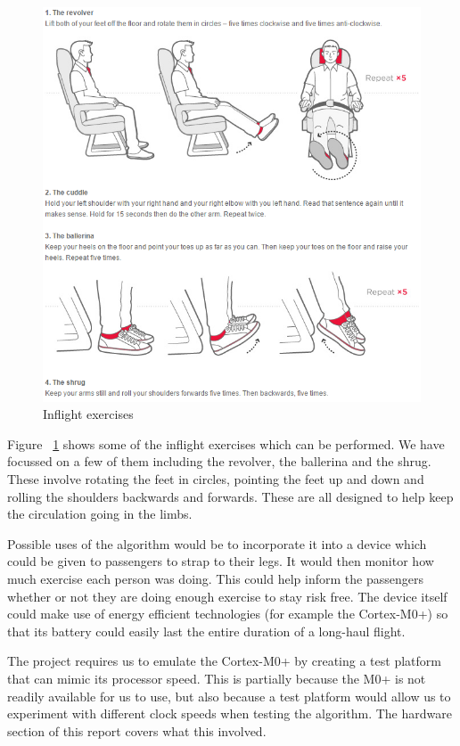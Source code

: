 \begin{figure}[h]
  \centering
    \includegraphics[width=1.0\textwidth]{intro/exercises}
  \caption{Inflight exercises \cite{virgin2015exercises}}
  \label{fig:exercises}
\end{figure}

Figure ~\ref{fig:exercises} shows some of the inflight exercises which can be performed. We have focussed on a few of them including the revolver, the ballerina and the shrug. These involve rotating the feet in circles, pointing the feet up and down and rolling the shoulders backwards and forwards. These are all designed to help keep the circulation going in the limbs.

Possible uses of the algorithm would be to incorporate it into a device which could be given to passengers to strap to their legs. It would then monitor how much exercise each person was doing. This could help inform the passengers whether or not they are doing enough exercise to stay risk free. The device itself could make use of energy efficient technologies (for example the Cortex-M0+) so that its battery could easily last the entire duration of a long-haul flight.

The project requires us to emulate the Cortex-M0+ by creating a test platform that can mimic its processor speed. This is partially because the M0+ is not readily available for us to use, but also because a test platform would allow us to experiment with different clock speeds when testing the algorithm. The hardware section of this report covers what this involved.

